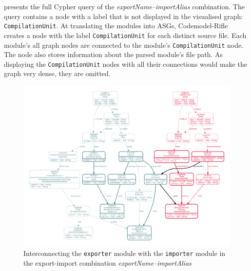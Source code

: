  presents the full Cypher query of the \emph{exportName–importAlias} combination. The query contains a node with a label that is not displayed in the visualised graph: \lstinline{CompilationUnit}. At translating the modules into ASGs, Codemodel-Rifle creates a node with the label \lstinline{CompilationUnit} for each distinct source file. Each module's all graph nodes are connected to the module's \lstinline{CompilationUnit} node. The node also stores information about the parsed module's file path. As displaying the \lstinline{CompilationUnit} nodes with all their connections would make the graph very dense, they are omitted.

\newpage
\vspace*{5em}
\begin{figure}[!h]
	\centerfloat
	\includegraphics[width=\textwidth+4cm, trim=12mm 12mm 12mm 12mm,clip]{figures/export-import-example-asg.pdf}
	\caption{Interconnecting the \lstinline{exporter} module with the \lstinline{importer} module in the export-import combination \emph{exportName–importAlias}}
	\label{fig:export-import-example-asg}
\end{figure}

